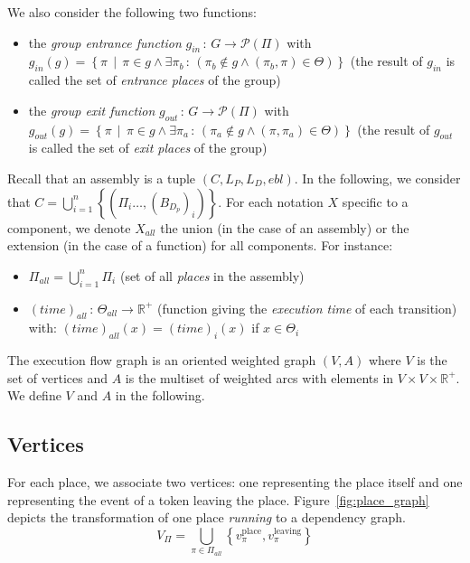 We also consider the following two functions:
\begin{itemize}
\item the \emph{group entrance function} $g_{in}\,:\,G\rightarrow\mathcal{P}\left(\Pi\right)$ with\\
$g_{in}(g)=\left\{ \pi\,\mid\,\pi\in g\land\exists\pi_{b}\,:\,\left(\pi_{b}\not\in g\land\left(\pi_{b},\pi\right)\in\Theta\right)\right\} $
(the result of $g_{in}$ is called the set of \emph{entrance places}
of the group)
\item the \emph{group exit function} $g_{out}\,:\,G\rightarrow\mathcal{P}\left(\Pi\right)$ with\\
$g_{out}(g)=\left\{ \pi\,\mid\,\pi\in g\land\exists\pi_{a}\,:\,\left(\pi_{a}\not\in g\land\left(\pi,\pi_{a}\right)\in\Theta\right)\right\} $
(the result of $g_{out}$ is called the set of \emph{exit places}
of the group)
\end{itemize}

Recall that an assembly is a tuple $\left(C,L_{P},L_{D},ebl\right)$. In
the following, we consider that
$C=\bigcup_{i=1}^{n}\left\{ \left(\Pi_{i}\dots,\left(B_{D_{p}}\right)_{i}\right)\right\} $.
For each notation $X$ specific to a component, we denote $X_{all}$ the
union (in the case of an assembly) or the extension (in the case of
a function) for all components. For instance:
\begin{itemize}
\item $\Pi_{all}=\bigcup_{i=1}^{n}\Pi_{i}$ (set of all \emph{places} in
the assembly)
\item $\left(time\right)_{all}\,:\,\Theta_{all}\rightarrow\mathbb{R}^{+}$
(function giving the \emph{execution time} of each transition) with:
$\left(time\right)_{all}\left(x\right)=\left(time\right)_{i}\left(x\right)$
if $x\in\Theta_{i}$ 
\end{itemize}
The execution flow graph is an oriented weighted graph \emph{$\left(V,A\right)$}
where $V$ is the set of vertices and $A$ is the multiset of weighted
arcs with elements in $V\times V\times\mathbb{R}^{+}$. We define
$V$ and $A$ in the following.

\subsection{Vertices}

For each place, we associate two vertices: one representing the place
itself and one representing the event of a token leaving the place.
Figure~\ref{fig:place_graph} depicts the transformation of one place
\emph{running} to a dependency graph.
\[
V_{\Pi}=\bigcup_{\pi\in\Pi_{all}}\left\{ v_\pi^\text{place},v_\pi^\text{leaving}\right\} 
\]

